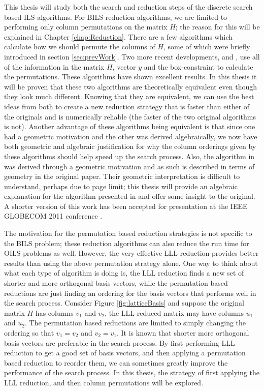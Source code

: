 \documentclass[12pt,Bold,letterpaper]{mcgilletdclass}
\begin{document}
This thesis will study both the search and reduction steps of the discrete search based ILS algorithms. For BILS reduction algorithms, we are limited to performing only column permutations on the matrix $H$; the reason for this will be explained in Chapter \ref{chap:Reduction}. There are a few algorithms which calculate how we should permute the columns of $H$, some of which were briefly introduced in section \ref{sec:prevWork}. Two more recent developments, \cite{ChaH05} and \cite{SuW05}, use all of the information in the matrix $H$, vector $y$ and the box-constraint to calculate the permutations. These algorithms have shown excellent results. In this thesis it will be proven that these two algorithms are theoretically equivalent even though they look much different. Knowing that they are equivalent, we can use the best ideas from both to create a new reduction strategy that is faster than either of the originals and is numerically reliable (the faster of the two original algorithms is not). Another advantage of these algorithms being equivalent is that since one had a geometric motivation and the other was derived algebraically, we now have both geometric and algebraic justification for why the column orderings given by these algorithms should help speed up the search process. Also, the algorithm in \cite{SuW05} was derived through a geometric motivation and as such is described in terms of geometry in the original paper. Their geometric interpretation is difficult to understand, perhaps due to page limit; this thesis will provide an algebraic explanation for the algorithm presented in \cite{SuW05} and offer some insight to the original. A shorter version of this work has been accepted for presentation at the IEEE GLOBECOM 2011 conference \cite{BreC11}.

The motivation for the permutation based reduction strategies is not specific to the BILS problem; these reduction algorithms can also reduce the run time for OILS problems as well. However, the very effective LLL reduction provides better results than using the above permutation strategy alone. One way to think about what each type of algorithm is doing is, the LLL reduction finds a new set of shorter and more orthogonal basis vectors, while the permutation based reductions are just finding an ordering for the basis vectors that performs well in the search process. Consider Figure \ref{fig:latticeBasis} and suppose the original matrix $H$ has columns $v_1$ and $v_2$, the LLL reduced matrix may have columns $u_1$ and $u_2$. The permutation based reductions are limited to simply changing the ordering so that $v_1 = v_2$ and $v_2 = v_1$. It is known that shorter more orthogonal basis vectors are preferable in the search process. By first performing LLL reduction to get a good set of basis vectors, and then applying a permutation based reduction to reorder them, we can sometimes greatly improve the performance of the search process. In this thesis, the strategy of first applying the LLL reduction, and then column permutations will be explored.
\end{document}
